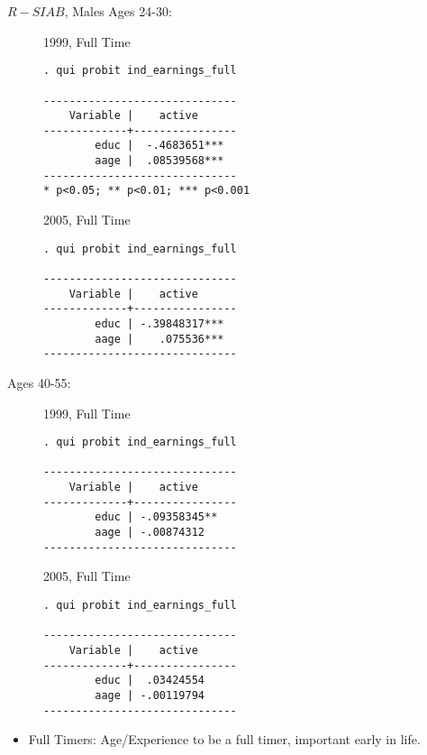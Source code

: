 \documentclass{beamer}
\begin{document}
\begin{frame}[fragile]{$R-SIAB$, Males}
Ages 24-30:
\begin{figure}
\centering
\begin{minipage}[b]{0.3\textwidth}{1999, Full Time}
\begin{Verbatim}[fontsize=\tiny]
. qui probit ind_earnings_full 

------------------------------
    Variable |    active      
-------------+----------------
        educ |  -.4683651***  
        aage |  .08539568*** 
------------------------------
* p<0.05; ** p<0.01; *** p<0.001
\end{Verbatim}
\end{minipage}
\begin{minipage}[b]{0.3\textwidth}{2005, Full Time}
\begin{Verbatim}[fontsize=\tiny]
. qui probit ind_earnings_full

------------------------------
    Variable |    active      
-------------+----------------
        educ | -.39848317***  
        aage |    .075536***   
------------------------------
\end{Verbatim}
\end{minipage}
\end{figure}
Ages 40-55:
\begin{figure}
\begin{minipage}[b]{0.3\textwidth}{1999, Full Time}
\begin{Verbatim}[fontsize=\tiny]
. qui probit ind_earnings_full 

------------------------------
    Variable |    active      
-------------+----------------
        educ | -.09358345**   
        aage | -.00874312  
------------------------------
\end{Verbatim}
\end{minipage}
\begin{minipage}[b]{0.3\textwidth}{2005, Full Time}
\begin{Verbatim}[fontsize=\tiny]
. qui probit ind_earnings_full

------------------------------
    Variable |    active      
-------------+----------------
        educ |  .03424554     
        aage | -.00119794  
------------------------------
\end{Verbatim}
\end{minipage}
\end{figure}
\begin{itemize}
\item Full Timers: Age/Experience to be a full timer, important early in life.
\end{itemize}
\end{frame}
\end{document}
